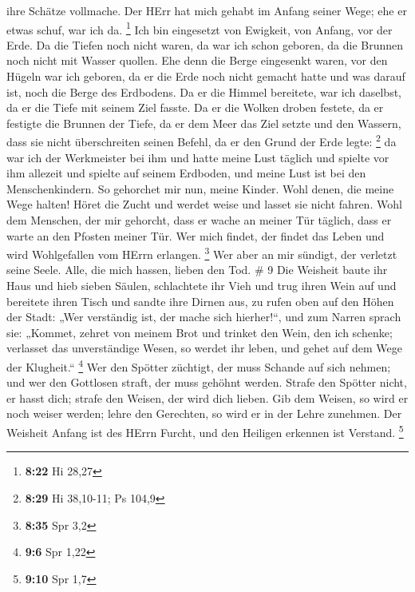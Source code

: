 ihre Schätze vollmache.  Der HErr hat mich gehabt im Anfang
seiner Wege; ehe er etwas schuf, war ich da. \footnote{\textbf{8:22} Hi
  28,27}  Ich bin eingesetzt von Ewigkeit, von Anfang, vor
der Erde.  Da die Tiefen noch nicht waren, da war ich schon
geboren, da die Brunnen noch nicht mit Wasser quollen.  Ehe
denn die Berge eingesenkt waren, vor den Hügeln war ich geboren,
 da er die Erde noch nicht gemacht hatte und was darauf
ist, noch die Berge des Erdbodens.  Da er die Himmel
bereitete, war ich daselbst, da er die Tiefe mit seinem Ziel fasste.
 Da er die Wolken droben festete, da er festigte die
Brunnen der Tiefe,  da er dem Meer das Ziel setzte und den
Wassern, dass sie nicht überschreiten seinen Befehl, da er den Grund der
Erde legte: \footnote{\textbf{8:29} Hi 38,10-11; Ps 104,9} 
da war ich der Werkmeister bei ihm und hatte meine Lust täglich und
spielte vor ihm allezeit  und spielte auf seinem Erdboden,
und meine Lust ist bei den Menschenkindern.  So gehorchet
mir nun, meine Kinder. Wohl denen, die meine Wege halten! 
Höret die Zucht und werdet weise und lasset sie nicht fahren.
 Wohl dem Menschen, der mir gehorcht, dass er wache an
meiner Tür täglich, dass er warte an den Pfosten meiner Tür.
 Wer mich findet, der findet das Leben und wird
Wohlgefallen vom HErrn erlangen. \footnote{\textbf{8:35} Spr 3,2}
 Wer aber an mir sündigt, der verletzt seine Seele. Alle,
die mich hassen, lieben den Tod. \# 9  Die Weisheit baute
ihr Haus und hieb sieben Säulen,  schlachtete ihr Vieh und
trug ihren Wein auf und bereitete ihren Tisch  und sandte
ihre Dirnen aus, zu rufen oben auf den Höhen der Stadt: 
„Wer verständig ist, der mache sich hierher!{}``, und zum Narren sprach
sie:  „Kommet, zehret von meinem Brot und trinket den Wein,
den ich schenke;  verlasset das unverständige Wesen, so
werdet ihr leben, und gehet auf dem Wege der Klugheit.`` \footnote{\textbf{9:6}
  Spr 1,22}  Wer den Spötter züchtigt, der muss Schande auf
sich nehmen; und wer den Gottlosen straft, der muss gehöhnt werden.
 Strafe den Spötter nicht, er hasst dich; strafe den Weisen,
der wird dich lieben.  Gib dem Weisen, so wird er noch
weiser werden; lehre den Gerechten, so wird er in der Lehre zunehmen.
 Der Weisheit Anfang ist des HErrn Furcht, und den Heiligen
erkennen ist Verstand. \footnote{\textbf{9:10} Spr 1,7} 
